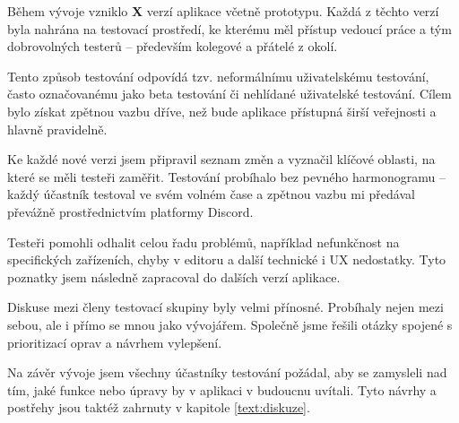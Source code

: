 Během vývoje vzniklo \textbf{X} verzí aplikace včetně prototypu. 
Každá z těchto verzí byla nahrána na testovací prostředí, ke kterému měl přístup vedoucí práce a tým dobrovolných testerů -- především kolegové a přátelé z okolí.

Tento způsob testování odpovídá tzv. neformálnímu uživatelskému testování, často označovanému jako beta testování či nehlídané uživatelské testování. 
Cílem bylo získat zpětnou vazbu dříve, než bude aplikace přístupná širší veřejnosti a hlavně pravidelně.

Ke každé nové verzi jsem připravil seznam změn a vyznačil klíčové oblasti, na které se měli testeři zaměřit. 
Testování probíhalo bez pevného harmonogramu -- každý účastník testoval ve svém volném čase a zpětnou vazbu mi předával převážně prostřednictvím platformy Discord.

Testeři pomohli odhalit celou řadu problémů, například nefunkčnost na specifických zařízeních, chyby v editoru a další technické i UX nedostatky. 
Tyto poznatky jsem následně zapracoval do dalších verzí aplikace.

Diskuse mezi členy testovací skupiny byly velmi přínosné.
Probíhaly nejen mezi sebou, ale i přímo se mnou jako vývojářem. 
Společně jsme řešili otázky spojené s prioritizací oprav a návrhem vylepšení.

Na závěr vývoje jsem všechny účastníky testování požádal, aby se zamysleli nad tím, jaké funkce nebo úpravy by v aplikaci v budoucnu uvítali. 
Tyto návrhy a postřehy jsou taktéž zahrnuty v kapitole \ref{text:diskuze}.






